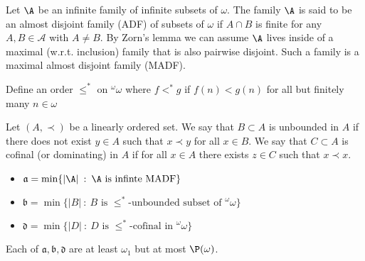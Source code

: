 \documentclass{article}
\begin{document}
\begin{defn}
    Let \(\A\) be an infinite family of infinite subsets of \(\omega\). The family \(\A\) is said to be an almost disjoint family (ADF) of subsets of \(\omega\) if \(A \cap B \) is finite for any \(A,B \in \mathcal{A}\) with \(A \ne B\). By Zorn's lemma we can assume \(\A\) lives inside of a maximal (w.r.t. inclusion) family that is also pairwise disjoint. Such a family is a maximal almost disjoint family (MADF).
\end{defn}
\begin{defn}
    Define an order \(\leq^{\ast}\) on \(^\omega\omega\) where \(f <^{\ast} g\) if \(f(n) < g(n)\) for all but finitely many \(n \in  \omega\)
\end{defn}
\begin{defn}
    Let \((A, \prec)\) be a linearly ordered set. We say that  \(B \subset A\) is unbounded in \(A\) if there does not exist \(y \in A\) such that \(x \prec y\) for all \(x \in B\). We say that \(C \subset A\) is cofinal (or dominating) in \(A\) if for all \(x \in A\) there exists \(z \in C\) such that \(x \prec x\).
\end{defn}
\begin{defn}
    \leavevmode
    \begin{itemize}
        \item \(\mathfrak{a} = \min\{|\A| \: : \: \A \text{ is infinte } \text{MADF}\}\)
        \item \(\mathfrak{b} = \min\{|B| \: : \: B \text{ is } \leq^{\ast}\text{-unbounded subset of }^\omega\omega\}\)
        \item \(\mathfrak{d} = \min\{|D| \: : \: D \text{ is } \leq^{\ast}\text{-cofinal in } ^\omega\omega
        \}\)
    \end{itemize}
    Each of \(\mathfrak{a}, \mathfrak{b}, \mathfrak{d}\) are at least \(\omega_1\) but at most \(\P(\omega)\).
\end{defn}
\end{document}
